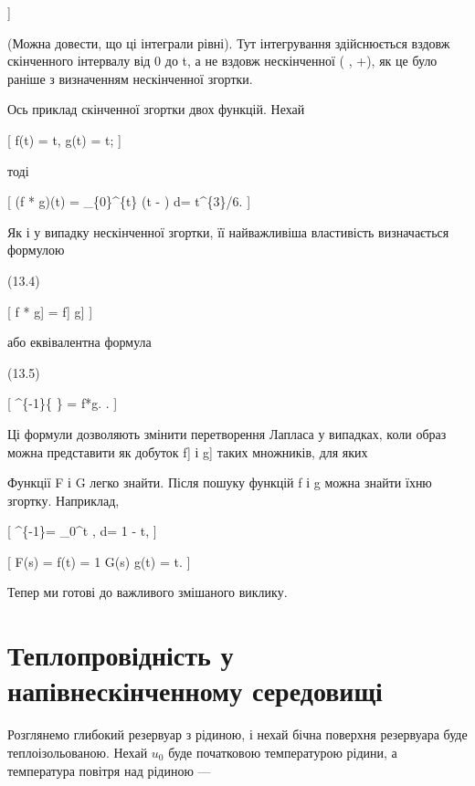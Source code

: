 \documentclass[
  ukrainian,
]{article}
\begin{document}
{]}

(Можна довести, що ці інтеграли рівні). Тут інтегрування здійснюється
вздовж скінченного інтервалу від 0 до t, а не вздовж нескінченної (
\infty , +\infty ), як це було раніше з визначенням нескінченної
згортки.

Ось приклад скінченної згортки двох функцій. Нехай

{[} f(t) = t, \quad g(t) = t; {]}

тоді

{[} (f * g)(t) = \int\_\{0\}\^{}\{t\} \tau(t - \tau) d\tau =
t\^{}\{3\}/6. {]}

Як і у випадку нескінченної згортки, її найважливіша властивість
визначається формулою

(13.4)

{[} \mathscr{L}{[}f * g{]} = \mathscr{L}{[}f{]} \mathscr{L}{[}g{]} {]}

або еквівалентна формула

(13.5)

{[} \^{}\{-1\}\left\{
\left[\mathscr{L}\left[f\right]\left[g\right]\right\} = f*g.
\right. {]}

Ці формули дозволяють змінити перетворення Лапласа у випадках, коли
образ можна представити як добуток \mathscr{L}{[}f{]} і
\mathscr{L}{[}g{]} таких множників, для яких

Функції F і G легко знайти. Після пошуку функцій f і g можна знайти їхню
згортку. Наприклад,

{[}
\^{}\{-1\} =
\int\_0\^{}t \sin \tau , d\tau = 1 - \cos t, {]}

{[} F(s) =   f(t) = 1
\quad G(s)  g(t) = \sin t. {]}

Тепер ми готові до важливого змішаного виклику.

\section{Теплопровідність у напівнескінченному
середовищі}\label{ux442ux435ux43fux43bux43eux43fux440ux43eux432ux456ux434ux43dux456ux441ux442ux44c-ux443-ux43dux430ux43fux456ux432ux43dux435ux441ux43aux456ux43dux447ux435ux43dux43dux43eux43cux443-ux441ux435ux440ux435ux434ux43eux432ux438ux449ux456}

Розглянемо глибокий резервуар з рідиною, і нехай бічна поверхня
резервуара буде теплоізольованою. Нехай \(u_0\) буде початковою
температурою рідини, а температура повітря над рідиною ---
\end{document}
